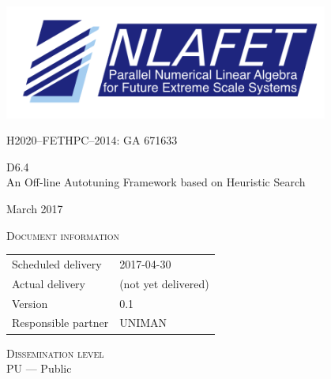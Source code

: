 \documentclass[a4paper,12pt]{article}
\def\nlafetMajor{6}
\def\nlafetMinor{4}
\def\nlafetTitle{An Off-line Autotuning Framework based on Heuristic Search}
\def\nlafetMonth{March}
\def\nlafetYear{2017}
\def\nlafetScheduledDelivery{2017-04-30}
\def\nlafetActualDelivery{(not yet delivered)}
\def\nlafetVersionMajor{0}
\def\nlafetVersionMinor{1}
\def\nlafetResponsiblePartner{UNIMAN}
\def\nlafetDisseminationLevel{PU --- Public}
\begin{document}
\begin{titlepage}
  \centering
  {
    \includegraphics[width=0.8\textwidth]{NLAFET-logo2}
  }
  \par
  \vspace{5mm}
  {
    H2020--FETHPC--2014: GA 671633
  }
  \par
  \vspace{4cm}
  {
    \Huge
    D\nlafetMajor.\nlafetMinor\\[1em]
    \nlafetTitle
  }
  \par
  \vfill
  {
    \Large
    \nlafetMonth{}
    \nlafetYear
  }
\end{titlepage}



%

\newpage

\noindent
\textsc{Document information}\\[1em]
\begin{tabular}{@{}ll}
  Scheduled delivery & \nlafetScheduledDelivery \\
  Actual delivery & \nlafetActualDelivery \\
  Version & \nlafetVersionMajor.\nlafetVersionMinor \\
  Responsible partner & \nlafetResponsiblePartner \\
\end{tabular}

\vspace{2em}

\noindent
\textsc{Dissemination level}\\[1em]
\nlafetDisseminationLevel
\end{document}
